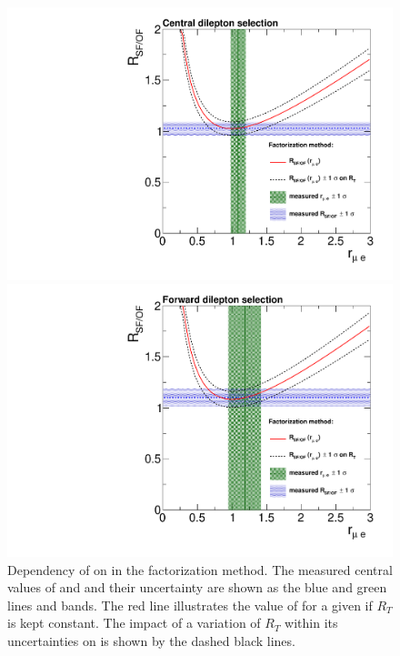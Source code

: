 \begin{figure}[htbp]
\centering
\begin{minipage}[t]{0.49\textwidth}
  \includegraphics[width=\textwidth]{plots/BG/rmue/rMuEPropaganda_central.pdf}
\end{minipage}
\begin{minipage}[t]{0.49\textwidth}
\includegraphics[width=\textwidth]{plots/BG/rmue/rMuEPropaganda_forward.pdf}
\end{minipage}

\caption{Dependency of \Rsfof on \rmue in the factorization method. The measured central values of \Rsfof and \rmue and their uncertainty are shown as the blue and green lines and bands. The red line illustrates the value of \Rsfof for a given \rmue if $R_T$ is kept constant. The impact of a variation of $R_T$ within its uncertainties on \Rsfof is shown by the dashed black lines.}
\label{fig:rmuePropaganda}
\end{figure} 

